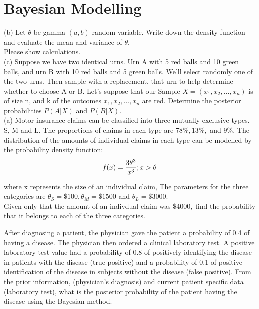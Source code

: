 \documentclass{article}
\begin{document}
{\section{Bayesian Modelling} 
(b)
Let \(  \theta \) be gamma \( (a,b) \) random variable. Write down the density function and evaluate the mean and variance of \( \theta. \) \\
Please show calculations. \\

(c)
Suppose we have two identical urns. Urn A with 5 red balls and 10 green balls, and urn B with 10 red balls and 5 green balls.  We'll select randomly one of the two urns. Then sample with a replacement, that urn to help determine whether to choose A or B. Let's suppose that our Sample \( X = (x_1, x_2, ..., x_n) \) is of size n, and k of the outcomes \( x_1, x_2, ..., x_n \) are red. Determine the posterior probabilities \( P(A|X) \) and \( P(B|X). \) \\


(a) Motor insurance claims can be classified into three mutually exclusive types. S, M and L. The proportions of claims in each type are \( 78 \%, 13 \%, \) and \( 9 \%. \) The distribution of the amounts of individual claims in each type can be modelled by the probability density function: \\

\[ 
f(x) = \frac{3 \theta ^{3}}{x^{3}}; x > \theta \\
\]

where x represents the size of an individual claim, The parameters for the three categories are \(  \theta _{S} = \$  100, \theta_{M} = \$ 1500 \) and \(  \theta _{L} = \$ 3000. \) \\

Given only that the amount of an indivdual claim was \(  \$ 4000,\) find the probability that it belongs to each of the three categories. 

\]
After diagnosing a patient, the physician gave the patient a probability of 0.4 of having a disease. The physician then ordered a clinical laboratory test. A positive laboratory test value had a probability of 0.8 of positively identifying the disease in patients with the disease (true positive) and a probability of 0.1 of positive identification of the disease in subjects without the disease (false positive). From the prior information, (physician's diagnosis) and current patient specific data (laboratory test), what is the posterior probability of the patient having the disease using the Bayesian method. \\

}
\end{document}
